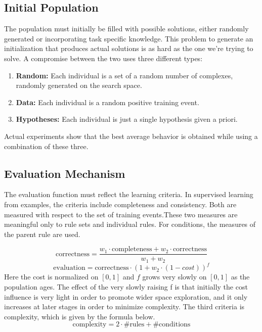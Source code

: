 \documentclass[../main.tex]{subfiles}
\begin{document}
\subsection{Initial Population}
The population must initially be filled with possible solutions, either randomly generated or incorporating task
specific knowledge. This problem to generate an initialization that produces actual solutions is as hard as the one
we're trying to solve. A compromise between the two uses three different types:

\begin{enumerate}
	\item \textbf{Random:} Each individual is a set of a random number of complexes, randomly generated on the search
	space.
	\item \textbf{Data:} Each individual is a random positive training event.
	\item \textbf{Hypotheses:} Each individual is just a single hypothesis given a priori.
\end{enumerate}

Actual experiments show that the best average behavior is obtained while using a combination of these three.

\subsection{Evaluation Mechanism}
The evaluation function must reflect the learning criteria. In supervised learning from examples, the criteria include
completeness and consistency. Both are measured with respect to the set of training events.These two measures are
meaningful only to rule sets and individual rules. For conditions, the measures of the parent rule are used.

\begin{equation}
\text{correctness} = \frac{w_1 \cdot \text{completeness} + w_2 \cdot \text{correctness}}{w_1 + w_2}
\end{equation}
\begin{equation}
	\text{evaluation} = \text{correctness} \cdot (1 + w_2 \cdot (1-cost))^f
\end{equation}
Here the cost is normalized on $[0,1]$ and $f$ grows very slowly on $[0,1]$ as the population ages. The effect of the
very slowly raising f is that initially the cost influence is very light in order to promote wider space exploration,
and it only increases at later stages in order to minimize complexity. The third criteria is complexity, which is given
by the formula below.
\begin{equation}
	\text{complexity} = 2 \cdot \text{\#rules} + \text{\#conditions}
\end{equation}
\end{document}
